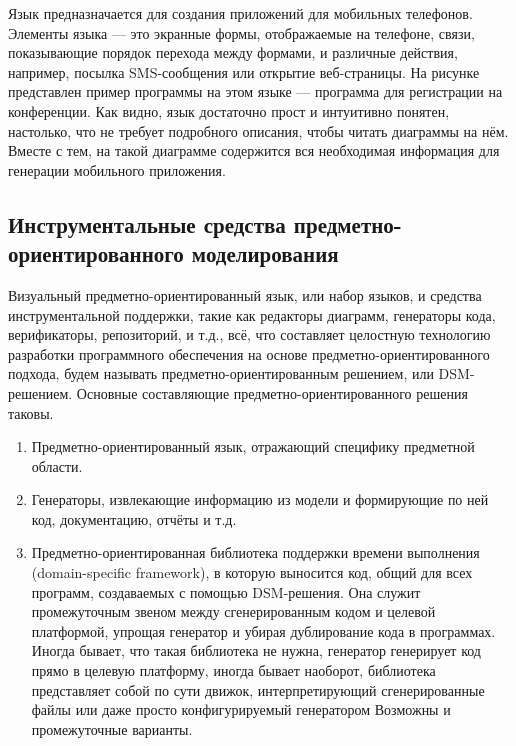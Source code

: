 Язык предназначается для создания приложений для мобильных телефонов. 
Элементы языка --- это экранные формы, отображаемые на телефоне, связи, 
показывающие порядок перехода между формами, и различные действия, например, 
посылка SMS-сообщения или открытие веб-страницы. На рисунке представлен пример 
программы на этом языке --- программа для регистрации на конференции. 
Как видно, язык достаточно прост и интуитивно понятен, настолько, что не требует 
подробного описания, чтобы читать диаграммы на нём. Вместе с тем, на такой 
диаграмме содержится вся необходимая информация для генерации мобильного 
приложения.

\subsection{Инструментальные средства предметно-ориентированного моделирования}
Визуальный предметно-ориентированный язык, или набор языков, и средства 
инструментальной поддержки, такие как редакторы диаграмм, генераторы кода, 
верификаторы, репозиторий, и т.д., всё, что составляет целостную технологию 
разработки программного обеспечения на основе предметно-ориентированного 
подхода, будем называть предметно-ориентированным решением, или DSM-решением. 
Основные составляющие предметно-ориентированного решения таковы.

\begin{enumerate}
	\item Предметно-ориентированный язык, отражающий специфику предметной области.
	\item Генераторы, извлекающие информацию из модели и формирующие по ней код, 
		документацию, отчёты и т.д.
	\item Предметно-ориентированная библиотека поддержки времени выполнения 
		(domain-specific framework), в которую выносится код, общий для всех 
		программ, создаваемых с помощью DSM-решения. Она служит промежуточным звеном 
		между сгенерированным кодом и целевой платформой, упрощая генератор и убирая 
		дублирование кода в программах. Иногда бывает, что такая библиотека не 
		нужна, генератор генерирует код прямо в целевую платформу, иногда бывает 
		наоборот, библиотека представляет собой по сути движок, интерпретирующий 
		сгенерированные файлы или даже просто конфигурируемый генератором 
		Возможны и промежуточные варианты.
\end{enumerate}

